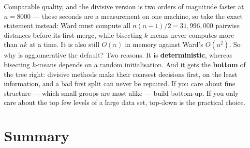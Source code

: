 \documentclass[11pt]{article}
\begin{document}
Comparable quality, and the divisive version is two orders of magnitude
faster at $n = 8000$ --- those seconds are a measurement on one machine, so
take the exact statement instead: Ward must compute all
$n(n-1)/2 = 31{,}996{,}000$ pairwise distances before its first merge, while
bisecting $k$-means never computes more than $nk$ at a time. It is also still
$O(n)$ in memory against Ward's $O(n^2)$. So why is agglomerative the
default?
Two reasons. It is \textbf{deterministic}, whereas bisecting $k$-means depends
on a random initialisation. And it gets the \textbf{bottom} of the tree right:
divisive methods make their coarsest decisions first, on the least
information, and a bad first split can never be repaired. If you care about
fine structure --- which small groups are most alike --- build bottom-up. If
you only care about the top few levels of a large data set, top-down is the
practical choice.

\section{Summary}
\label{sec:summary}
\end{document}
